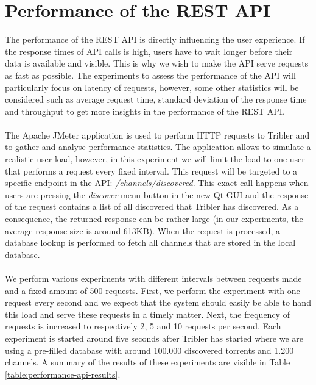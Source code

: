 \section{Performance of the REST API}
The performance of the REST API is directly influencing the user experience. If the response times of API calls is high, users have to wait longer before their data is available and visible. This is why we wish to make the API serve requests as fast as possible. The experiments to assess the performance of the API will particularly focus on latency of requests, however, some other statistics will be considered such as average request time, standard deviation of the response time and throughput to get more insights in the performance of the REST API.\\\\
The Apache JMeter application\cite{jmeter2010apache} is used to perform HTTP requests to Tribler and to gather and analyse performance statistics. The application allows to simulate a realistic user load, however, in this experiment we will limit the load to one user that performs a request every fixed interval. This request will be targeted to a specific endpoint in the API: \emph{/channels/discovered}. This exact call happens when users are pressing the \emph{discover} menu button in the new Qt GUI and the response of the request contains a list of all discovered that Tribler has discovered. As a consequence, the returned response can be rather large (in our experiments, the average response size is around 613KB). When the request is processed, a database lookup is performed to fetch all channels that are stored in the local database.\\\\
We perform various experiments with different intervals between requests made and a fixed amount of 500 requests. First, we perform the experiment with one request every second and we expect that the system should easily be able to hand this load and serve these requests in a timely matter. Next, the frequency of requests is increased to respectively 2, 5 and 10 requests per second. Each experiment is started around five seconds after Tribler has started where we are using a pre-filled database with around 100.000 discovered torrents and 1.200 channels. A summary of the results of these experiments are visible in Table \ref{table:performance-api-results}.\\\\

